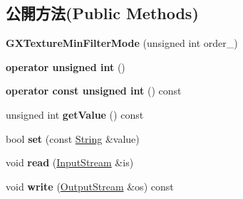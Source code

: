 \subsection*{公開方法(Public Methods)}
\begin{DoxyCompactItemize}
\item 
{\bfseries G\+X\+Texture\+Min\+Filter\+Mode} (unsigned int order\+\_)\hypertarget{class_magnum_1_1_g_x_texture_min_filter_mode_adc5e007bdfb3f448fa149c1ab3eb8177}{}\label{class_magnum_1_1_g_x_texture_min_filter_mode_adc5e007bdfb3f448fa149c1ab3eb8177}

\item 
{\bfseries operator unsigned int} ()\hypertarget{class_magnum_1_1_g_x_texture_min_filter_mode_a82a528401d5924016247427905fdfc19}{}\label{class_magnum_1_1_g_x_texture_min_filter_mode_a82a528401d5924016247427905fdfc19}

\item 
{\bfseries operator const unsigned int} () const \hypertarget{class_magnum_1_1_g_x_texture_min_filter_mode_ae1967cb8a64124b0ccfa2403a41e0d7c}{}\label{class_magnum_1_1_g_x_texture_min_filter_mode_ae1967cb8a64124b0ccfa2403a41e0d7c}

\item 
unsigned int {\bfseries get\+Value} () const \hypertarget{class_magnum_1_1_g_x_texture_min_filter_mode_aaf32b534f717884c80cf46be0fbca5cc}{}\label{class_magnum_1_1_g_x_texture_min_filter_mode_aaf32b534f717884c80cf46be0fbca5cc}

\item 
bool {\bfseries set} (const \hyperlink{class_magnum_1_1_string}{String} \&value)\hypertarget{class_magnum_1_1_g_x_texture_min_filter_mode_a7f49dc68919faefa470d015261ac1048}{}\label{class_magnum_1_1_g_x_texture_min_filter_mode_a7f49dc68919faefa470d015261ac1048}

\item 
void {\bfseries read} (\hyperlink{class_magnum_1_1_input_stream}{Input\+Stream} \&is)\hypertarget{class_magnum_1_1_g_x_texture_min_filter_mode_ae70c2d2670616463a88edb86d2704ee0}{}\label{class_magnum_1_1_g_x_texture_min_filter_mode_ae70c2d2670616463a88edb86d2704ee0}

\item 
void {\bfseries write} (\hyperlink{class_magnum_1_1_output_stream}{Output\+Stream} \&os) const \hypertarget{class_magnum_1_1_g_x_texture_min_filter_mode_a73ee52ec72cf8ec25d9c67f56d4543a7}{}\label{class_magnum_1_1_g_x_texture_min_filter_mode_a73ee52ec72cf8ec25d9c67f56d4543a7}

\end{DoxyCompactItemize}
